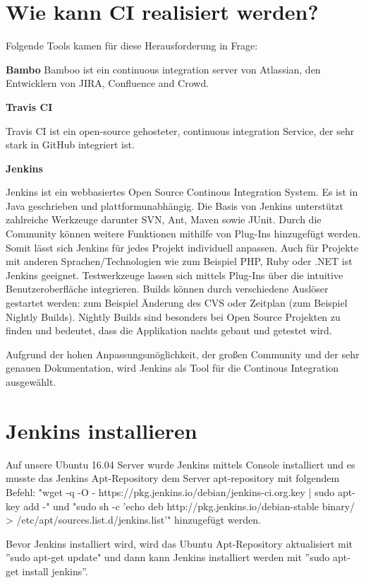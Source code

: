\section{Wie kann CI realisiert werden?}\label{sec:whyci}
Folgende Tools kamen für diese Herausforderung in Frage:

\textbf{Bambo}
Bamboo ist ein continuous integration server von Atlassian, den Entwicklern von JIRA, Confluence and Crowd. 

\textbf{Travis CI}

Travis CI ist ein open-source gehosteter, continuous integration Service, der sehr stark in  GitHub integriert ist.

\textbf{Jenkins}

Jenkins ist ein webbasiertes Open Source Continous Integration System. Es ist in Java geschrieben und plattformunabhängig. Die Basis von Jenkins unterstützt zahlreiche Werkzeuge darunter SVN, Ant, Maven sowie JUnit. Durch die Community können weitere Funktionen mithilfe von Plug-Ins hinzugefügt werden. Somit lässt sich Jenkins für jedes Projekt individuell anpassen. Auch für Projekte mit anderen Sprachen/Technologien wie zum Beispiel PHP, Ruby oder .NET ist Jenkins geeignet. Testwerkzeuge lassen sich mittels Plug-Ins über die intuitive Benutzeroberfläche integrieren. Builds können durch verschiedene Auslöser gestartet werden: zum Beispiel Änderung des CVS oder Zeitplan (zum Beispiel Nightly Builds). Nightly Builds sind besonders bei Open Source Projekten zu finden und bedeutet, dass die Applikation nachts gebaut und getestet wird.

Aufgrund der hohen Anpassungsmöglichkeit, der großen Community und der sehr genauen Dokumentation, wird Jenkins als Tool für die Continous Integration ausgewählt.

\section{Jenkins installieren}
\label{sec:jenkinsinstallation}
Auf unsere Ubuntu 16.04 Server wurde Jenkins mittels Console installiert und es musste das Jenkins Apt-Repository dem Server apt-repository mit folgendem Befehl: "wget -q -O - https://pkg.jenkins.io/debian/jenkins-ci.org.key | sudo apt-key add -" und 
"sudo sh -c 'echo deb http://pkg.jenkins.io/debian-stable binary/ > /etc/apt/sources.list.d/jenkins.list'" hinzugefügt werden.

Bevor Jenkins installiert wird, wird das Ubuntu Apt-Repository aktualisiert mit ''sudo apt-get update" und dann kann Jenkins installiert werden mit ''sudo apt-get install jenkins''.


